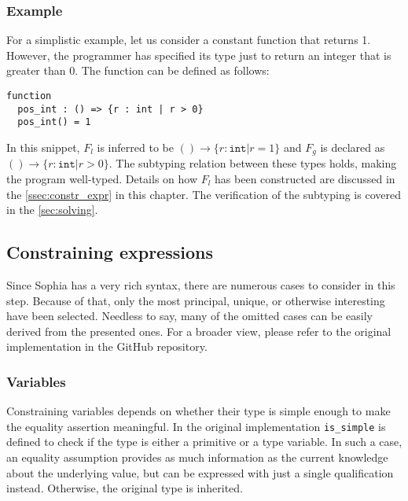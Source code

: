 \subsubsection{Example}

For a simplistic example, let us consider a constant function that returns 1.
However, the programmer has specified its type just to return an integer that is
greater than 0. The function can be defined as follows:

\begin{minipage}{\linewidth}
\begin{lstlisting}[language=sophia]
function
  pos_int : () => {r : int | r > 0}
  pos_int() = 1
\end{lstlisting}
\end{minipage}

In this snippet, $F_l$ is inferred to be $() \to \{r : \texttt{int} | r =
1\}$ and $F_g$ is declared as $() \to \{r : \texttt{int} | r > 0\}$. The
subtyping relation between these types holds, making the program well-typed.
Details on how $F_l$ has been constructed are discussed in the
\autoref{ssec:constr_expr} in this chapter. The verification of the subtyping is
covered in the \autoref{sec:solving}.

\subsection{Constraining expressions}
\label{ssec:constr_expr}

Since Sophia has a very rich syntax, there are numerous cases to consider in
this step. Because of that, only the most principal, unique, or otherwise
interesting have been selected. Needless to say, many of the omitted cases can
be easily derived from the presented ones. For a broader view, please refer to
the original implementation in the GitHub repository.

\subsubsection{Variables}

Constraining variables depends on whether their type is simple enough to make
the equality assertion meaningful. In the original implementation
\texttt{is\_simple} is defined to check if the type is either a primitive or a
type variable. In such a case, an equality assumption provides as much
information as the current knowledge about the underlying value, but can be
expressed with just a single qualification instead. Otherwise, the original type
is inherited.

